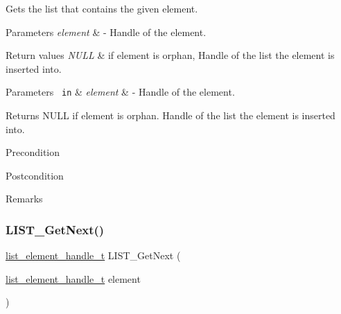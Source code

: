 Gets the list that contains the given element. 


\begin{DoxyParams}{Parameters}
{\em element} & -\/ Handle of the element. \\
\hline
\end{DoxyParams}

\begin{DoxyRetVals}{Return values}
{\em N\+U\+LL} & if element is orphan, Handle of the list the element is inserted into.\\
\hline
\end{DoxyRetVals}


 
\begin{DoxyParams}[1]{Parameters}
\mbox{\texttt{ in}}  & {\em element} & -\/ Handle of the element.\\
\hline
\end{DoxyParams}
\begin{DoxyReturn}{Returns}
N\+U\+LL if element is orphan. Handle of the list the element is inserted into.
\end{DoxyReturn}
\begin{DoxyPrecond}{Precondition}

\end{DoxyPrecond}
\begin{DoxyPostcond}{Postcondition}

\end{DoxyPostcond}
\begin{DoxyRemark}{Remarks}
\begin{DoxyVerb}\end{DoxyVerb}
 
\end{DoxyRemark}
\mbox{\label{group___generic_list_ga81ccc9e202a9475e56ce9735fb33c0fe}} 
\subsubsection{\texorpdfstring{LIST\_GetNext()}{LIST\_GetNext()}}
{\footnotesize\ttfamily \mbox{\hyperlink{structlist__element__tag}{list\+\_\+element\+\_\+handle\+\_\+t}} L\+I\+S\+T\+\_\+\+Get\+Next (\begin{DoxyParamCaption}\item[{\mbox{\hyperlink{structlist__element__tag}{list\+\_\+element\+\_\+handle\+\_\+t}}}]{element }\end{DoxyParamCaption})}



